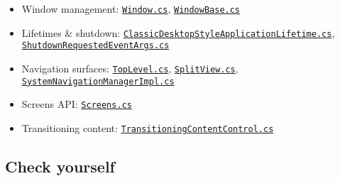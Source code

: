 \begin{itemize}
\tightlist
\item
  Window management:
  \href{https://github.com/AvaloniaUI/Avalonia/blob/master/src/Avalonia.Controls/Window.cs}{\passthrough{\lstinline!Window.cs!}},
  \href{https://github.com/AvaloniaUI/Avalonia/blob/master/src/Avalonia.Controls/WindowBase.cs}{\passthrough{\lstinline!WindowBase.cs!}}
\item
  Lifetimes \& shutdown:
  \href{https://github.com/AvaloniaUI/Avalonia/blob/master/src/Avalonia.Controls/ApplicationLifetimes/ClassicDesktopStyleApplicationLifetime.cs}{\passthrough{\lstinline!ClassicDesktopStyleApplicationLifetime.cs!}},
  \href{https://github.com/AvaloniaUI/Avalonia/blob/master/src/Avalonia.Controls/ApplicationLifetimes/ShutdownRequestedEventArgs.cs}{\passthrough{\lstinline!ShutdownRequestedEventArgs.cs!}}
\item
  Navigation surfaces:
  \href{https://github.com/AvaloniaUI/Avalonia/blob/master/src/Avalonia.Controls/TopLevel.cs}{\passthrough{\lstinline!TopLevel.cs!}},
  \href{https://github.com/AvaloniaUI/Avalonia/blob/master/src/Avalonia.Controls/SplitView.cs}{\passthrough{\lstinline!SplitView.cs!}},
  \href{https://github.com/AvaloniaUI/Avalonia/blob/master/src/Avalonia.Base/Platform/SystemNavigationManagerImpl.cs}{\passthrough{\lstinline!SystemNavigationManagerImpl.cs!}}
\item
  Screens API:
  \href{https://github.com/AvaloniaUI/Avalonia/blob/master/src/Avalonia.Controls/Screens.cs}{\passthrough{\lstinline!Screens.cs!}}
\item
  Transitioning content:
  \href{https://github.com/AvaloniaUI/Avalonia/blob/master/src/Avalonia.Controls/TransitioningContentControl.cs}{\passthrough{\lstinline!TransitioningContentControl.cs!}}
\end{itemize}

\subsection{Check yourself}\label{check-yourself-10}

